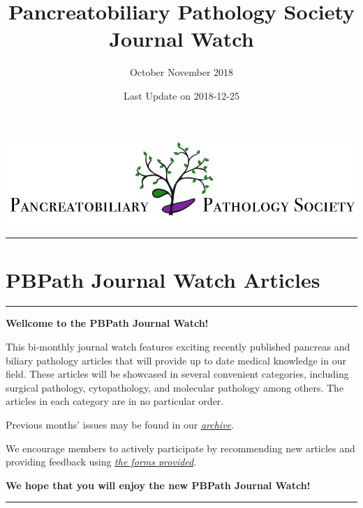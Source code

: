 \documentclass[]{article}
\title{Pancreatobiliary Pathology Society Journal Watch}
\subtitle{October November 2018}
\author{}
\date{Last Update on 2018-12-25}
\begin{document}
\maketitle

{
\setcounter{tocdepth}{5}
\tableofcontents
}
\href{http://pbpath.org/}{\includegraphics{figures/PBP_header_logo.jpg}}

\begin{center}\rule{0.5\linewidth}{\linethickness}\end{center}

\hypertarget{pbpath-journal-watch-articles}{%
\section{PBPath Journal Watch
Articles}\label{pbpath-journal-watch-articles}}

\begin{center}\rule{0.5\linewidth}{\linethickness}\end{center}

\textbf{Wellcome to the PBPath Journal Watch!}

This bi-monthly journal watch features exciting recently published
pancreas and biliary pathology articles that will provide up to date
medical knowledge in our field. These articles will be showcased in
several convenient categories, including surgical pathology,
cytopathology, and molecular pathology among others. The articles in
each category are in no particular order.

Previous months' issues may be found in our
\emph{\href{http://pbpath.org/journal-watch-archive/}{archive}}.

We encourage members to actively participate by recommending new
articles and providing feedback using
\emph{\href{https://docs.google.com/forms/d/e/1FAIpQLSeD3Z9J6Y7eMmiyM12f_SfAmHUlykb1zxZcwO6lg7cebGYQIQ/viewform}{the
forms provided}}.

\textbf{We hope that you will enjoy the new PBPath Journal Watch!}

\pagebreak

\begin{center}\rule{0.5\linewidth}{\linethickness}\end{center}
\end{document}
